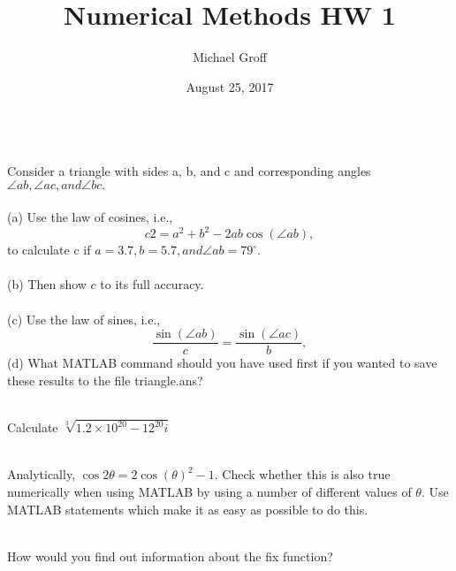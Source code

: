 \documentclass[12pt]{article}
\newenvironment{problem}[2][Problem]{\begin{trivlist}
\item[\hskip \labelsep {\bfseries #1}\hskip \labelsep {\bfseries #2.}]}{\end{trivlist}}
\begin{document}
\title{Numerical Methods HW 1}
\author{Michael Groff\\ 
}
\date{August 25, 2017}
\maketitle

\begin{problem}{1}
\text{ }\\
 Consider a triangle with sides a, b, and c and corresponding angles $\angle ab, \angle ac, and \angle bc.$\\
 \text{ }\\
(a) Use the law of cosines, i.e., 
\[ c2 = a^2 + b^2 - 2ab \cos(\angle ab) , \]
 to calculate c if $a = 3.7, b = 5.7, and \angle ab = 79^{\circ}. $\\
 \text{ }\\
(b) Then show $c$ to its full accuracy. \\
\text{ }\\
(c) Use the law of sines, i.e., \[ \frac{\sin(\angle ab)}{c} =\frac{ \sin(\angle ac)}{b} ,\]
(d) What MATLAB command should you have used first if you wanted to save these results to the file triangle.ans? 
 
\end{problem}

\begin{problem}{2}
\text{ }\\
Calculate $ \sqrt[3]{1.2\times 10^{20} - 12^{20}i }$
 
\end{problem}

\begin{problem}{3}
\text{ }\\
 Analytically, $\cos2 \theta  = 2 \cos (\theta)^2-1$. Check whether this is also true numerically when using MATLAB by using a number of different values of $\theta$. Use MATLAB statements which make it as easy as possible to do this. 
  
\end{problem}

\begin{problem}{4}
\text{ }\\
 How would you find out information about the fix function?
 
\end{problem}
\end{document}
